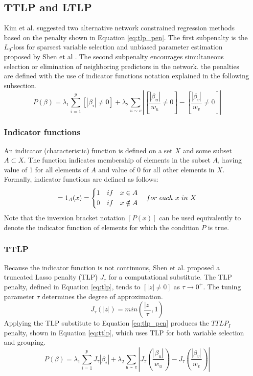 \subsection{TTLP and LTLP}
Kim et al. \cite{kim2013network} suggested two alternative network constrained regression methods based on the penalty shown in Equation \ref{eq:tlp_pen}. The first subpenalty is the $L_0$-loss for sparsest variable selection and unbiased parameter estimation proposed by Shen et al \cite{shen2012likelihood}. The second subpenalty encourages simultaneous selection or elimination of neighboring predictors in the network. the penalties are defined with the use of indicator functions notation explained in the following subsection.
\begin{equation} \label{eq:tlp_pen}
P(\beta) = \lambda_1 \sum_{i=1}^{p} [|\beta_i|\neq 0] + \lambda_2 \sum_{u \sim v} \left|\left[\frac{|\beta_u|}{w_u}\neq 0\right]-\left[\frac{|\beta_v|}{w_v}\neq 0\right]\right|
\end{equation}

\subsubsection{Indicator functions}
An indicator (characteristic) function is defined on a set $X$ and some subset $A \subset X$. The function indicates membership of elements in the subset $A$, having value of 1 for all elements of $A$ and value of 0 for all other elements in $X$. Formally, indicator functions are defined as follows:
\begin{equation}
[x \in A] = 1_A (x) = \left\{ 
\begin{aligned} 
1 & \quad if \quad x \in A \cr 
0 & \quad if \quad x \notin A
\end{aligned} \right.
for\ each\ x\ in\ X
\end{equation}
Note that the inversion bracket notation $[P(x)]$ can be used equivalently to denote the indicator function of elements for which the condition $P$ is true.

\subsubsection{TTLP} \label{sec:ttlp}
Because the indicator function is not continuous, Shen et al. \cite{shen2012likelihood} proposed a truncated Lasso penalty (TLP) $J_\tau$ for a computational substitute. The TLP penalty, defined in Equation \ref{eq:tlp}, tends to $[|z|\neq 0]$ as $\tau \to 0^+$. The tuning parameter $\tau$ determines the degree of approximation.
\begin{equation} \label{eq:tlp}
J_\tau(|z|)=min\left(\frac{|z|}{\tau},1\right)
\end{equation}
Applying the TLP substitute to Equation \ref{eq:tlp_pen} produces the $TTLP_I$ penalty, shown in Equation \ref{eq:ttlp}, which uses TLP for both variable selection and grouping.
\begin{equation} \label{eq:ttlp}
P(\beta) = \lambda_1 \sum_{i=1}^{p} J_\tau|\beta_i| + \lambda_2 \sum_{u \sim v} \left|J_\tau\left(\frac{|\beta_u|}{w_u}\right)-J_\tau\left(\frac{|\beta_v|}{w_v}\right)\right|
\end{equation}

